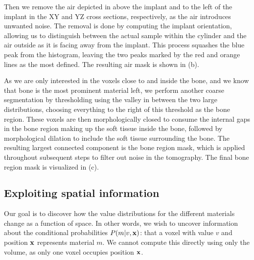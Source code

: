Then we remove the air depicted in  above the implant and
to the left of the implant in the XY and YZ cross sections, respectively, as
the air introduces unwanted noise. The removal is done by computing the implant
orientation, allowing us to distinguish between the actual sample within the
cylinder and the air outside as it is facing away from the implant. This
process squashes the blue peak from the histogram, leaving the two peaks marked
by the red and orange lines as the most defined. The resulting air mask is
shown in  (b).


As we are only interested in the voxels close to and inside the bone, and we
know that bone is the most prominent material left, we perform another coarse
segmentation by thresholding using the valley in between the two large
distributions, choosing everything to the right of this threshold as the bone
region. These voxels are then morphologically closed to consume the internal
gaps in the bone region making up the soft tissue inside the bone, followed by
morphological dilation to include the soft tissue surrounding the bone. The
resulting largest connected component is the bone region mask, which is applied
throughout subsequent steps to filter out noise in the tomography. The final
bone region mask is visualized in  (c).

\subsection{Exploiting spatial information}
Our goal is to discover how the value distributions for the different materials
change as a function of space. In other words, we wish to uncover information
about the conditional probabilities $P\!\left(m\middle\vert v,\mathbf{x}\right)$: that a voxel with value
$v$ and position $\mathbf{x}$ represents material $m$. We cannot compute this directly
using only the volume, as only one voxel occupies position $\mathbf{x}$.

